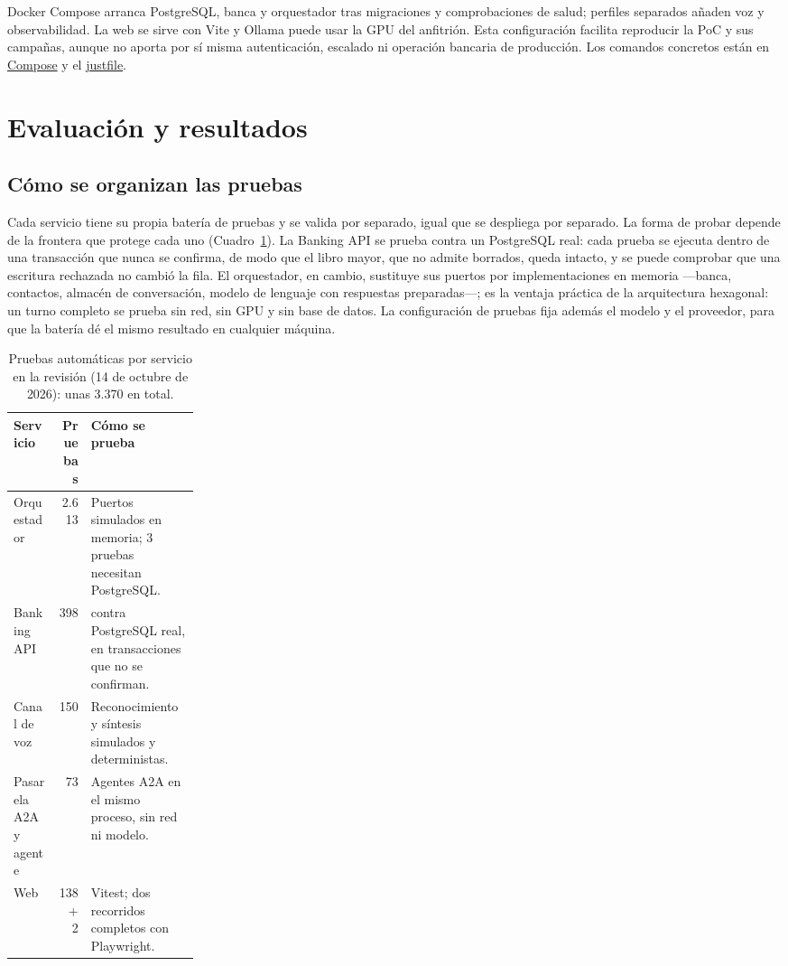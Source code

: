 \documentclass[12pt,a4paper]{article}
\begin{document}
Docker Compose arranca PostgreSQL, banca y orquestador tras migraciones y comprobaciones de salud; perfiles separados añaden voz y observabilidad. La web se sirve con Vite y Ollama puede usar la GPU del anfitrión. Esta configuración facilita reproducir la PoC y sus campañas, aunque no aporta por sí misma autenticación, escalado ni operación bancaria de producción. Los comandos concretos están en \href{https://github.com/adrianoggm/FinGuard/blob/main/compose.yaml}{Compose} y el \href{https://github.com/adrianoggm/FinGuard/blob/main/justfile}{justfile}.

\section{Evaluación y resultados}
\label{sec:evaluation}
\subsection{Cómo se organizan las pruebas}
Cada servicio tiene su propia batería de pruebas y se valida por separado, igual que se despliega por separado. La forma de probar depende de la frontera que protege cada uno (Cuadro~\ref{tab:test-suites}). La Banking API se prueba contra un PostgreSQL real: cada prueba se ejecuta dentro de una transacción que nunca se confirma, de modo que el libro mayor, que no admite borrados, queda intacto, y se puede comprobar que una escritura rechazada no cambió la fila. El orquestador, en cambio, sustituye sus puertos por implementaciones en memoria ---banca, contactos, almacén de conversación, modelo de lenguaje con respuestas preparadas---; es la ventaja práctica de la arquitectura hexagonal: un turno completo se prueba sin red, sin GPU y sin base de datos. La configuración de pruebas fija además el modelo y el proveedor, para que la batería dé el mismo resultado en cualquier máquina.

\begin{table}[H]
\centering\small
\begin{tabularx}{\linewidth}{>{\raggedright\arraybackslash}p{0.24\linewidth}r>{\raggedright\arraybackslash}X}
\toprule
\textbf{Servicio} & \textbf{Pruebas} & \textbf{Cómo se prueba}\\
\midrule
Orquestador & 2.613 & Puertos simulados en memoria; 3 pruebas necesitan PostgreSQL.\\
Banking API & 398 & 152 contra PostgreSQL real, en transacciones que no se confirman.\\
Canal de voz & 150 & Reconocimiento y síntesis simulados y deterministas.\\
Pasarela A2A y agente & 73 & Agentes A2A en el mismo proceso, sin red ni modelo.\\
Web & 138 + 2 & Vitest; dos recorridos completos con Playwright.\\
\bottomrule
\end{tabularx}
\caption{Pruebas automáticas por servicio en la revisión  (14 de octubre de 2026): unas 3.370 en total.}
\label{tab:test-suites}
\end{table}
\end{document}
